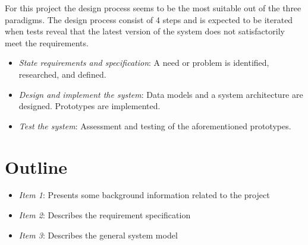 For this project the design process seems to be the most suitable out of the three paradigms. The design process consist of 4 steps and is expected to be iterated when tests reveal that the latest version of the system does not satisfactorily meet the requirements.

\begin{itemize}
  \item \emph{State requirements and specification}: A need or problem is identified, researched, and defined.
  \item \emph{Design and implement the system}: Data models and a system architecture are designed. Prototypes are implemented.
  \item \emph{Test the system}: Assessment and testing of the aforementioned prototypes.
\end{itemize}

\section{Outline}

\begin{itemize}
  \item \emph{Item 1}: Presents some background information related to the project
  \item \emph{Item 2}: Describes the requirement specification
  \item \emph{Item 3}: Describes the general system model
\end{itemize}